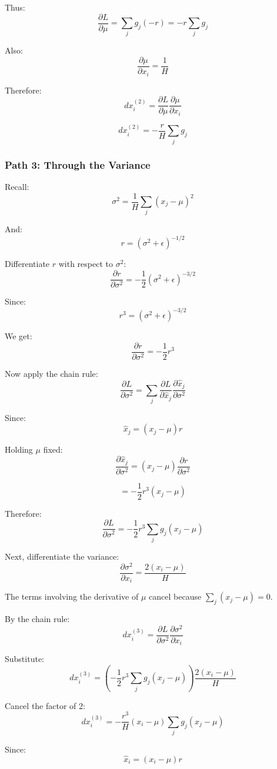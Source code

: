 \documentclass{article}
\begin{document}
Thus:
\[
\frac{\partial L}{\partial\mu}
=
\sum_j g_j(-r)
=
-r\sum_j g_j
\]

Also:
\[
\frac{\partial\mu}{\partial x_i}=\frac{1}{H}
\]

Therefore:
\[
dx_i^{(2)}
=
\frac{\partial L}{\partial\mu}
\frac{\partial\mu}{\partial x_i}
\]

\[
\boxed{
dx_i^{(2)}=-\frac{r}{H}\sum_j g_j
}
\]

\subsubsection{Path 3: Through the Variance}

Recall:
\[
\sigma^2=\frac{1}{H}\sum_j(x_j-\mu)^2
\]

And:
\[
r=(\sigma^2+\epsilon)^{-1/2}
\]

Differentiate $r$ with respect to $\sigma^2$:
\[
\frac{\partial r}{\partial\sigma^2}
=
-\frac{1}{2}(\sigma^2+\epsilon)^{-3/2}
\]

Since:
\[
r^3=(\sigma^2+\epsilon)^{-3/2}
\]

We get:
\[
\frac{\partial r}{\partial\sigma^2}
=-\frac{1}{2}r^3
\]

Now apply the chain rule:
\[
\frac{\partial L}{\partial\sigma^2}
=
\sum_j
\frac{\partial L}{\partial\hat{x}_j}
\frac{\partial\hat{x}_j}{\partial\sigma^2}
\]

Since:
\[
\hat{x}_j=(x_j-\mu)r
\]

Holding $\mu$ fixed:
\[
\frac{\partial\hat{x}_j}{\partial\sigma^2}
=
(x_j-\mu)\frac{\partial r}{\partial\sigma^2}
\]

\[
=-\frac{1}{2}r^3(x_j-\mu)
\]

Therefore:
\[
\boxed{
\frac{\partial L}{\partial\sigma^2}
=
-\frac{1}{2}r^3
\sum_j g_j(x_j-\mu)
}
\]

Next, differentiate the variance:
\[
\frac{\partial\sigma^2}{\partial x_i}
=
\frac{2(x_i-\mu)}{H}
\]

The terms involving the derivative of $\mu$ cancel
because $\sum_j(x_j-\mu)=0$.

By the chain rule:
\[
dx_i^{(3)}
=
\frac{\partial L}{\partial\sigma^2}
\frac{\partial\sigma^2}{\partial x_i}
\]

Substitute:
\[
dx_i^{(3)}
=
\left(
-\frac{1}{2}r^3
\sum_j g_j(x_j-\mu)
\right)
\frac{2(x_i-\mu)}{H}
\]

Cancel the factor of 2:
\[
dx_i^{(3)}
=
-\frac{r^3}{H}(x_i-\mu)
\sum_j g_j(x_j-\mu)
\]

Since:
\[
\hat{x}_i=(x_i-\mu)r
\]
\end{document}
